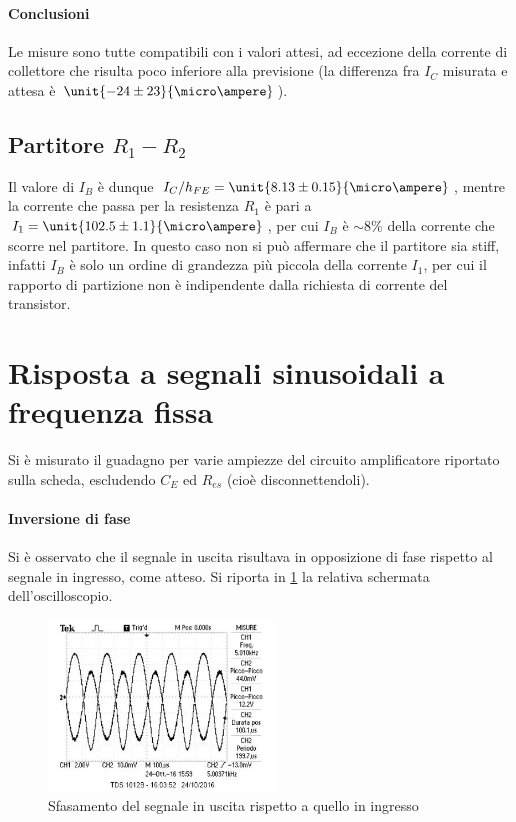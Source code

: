 \documentclass[10pt,a4paper]{article}
\begin{document}
\paragraph{Conclusioni}Le misure sono tutte compatibili con i valori attesi, ad eccezione della corrente di collettore che risulta poco inferiore alla previsione (la differenza fra $I_C$ misurata e attesa è $\unit{-24 \pm 23}{\micro\ampere}$).



\subsection{Partitore $R_1-R_2$}
Il valore di $I_B$ è dunque $I_C/h_{FE} = \unit{8.13 \pm 0.15}{\micro\ampere}$, mentre la corrente che passa per la resistenza $R_1$ è pari a $I_1 = \unit{102.5 \pm 1.1}{\micro\ampere}$, per cui $I_B$ è $\sim 8\%$ della corrente che scorre nel partitore. In questo caso non si può affermare che il partitore sia stiff, infatti $I_B$ è solo un ordine di grandezza più piccola della corrente $I_1$, per cui il rapporto di partizione non è indipendente dalla richiesta di corrente del transistor.

\section{Risposta a segnali sinusoidali a frequenza fissa}
Si è misurato il guadagno per varie ampiezze del circuito amplificatore riportato sulla scheda, escludendo $C_E$ ed $R_{es}$ (cioè disconnettendoli).

\paragraph{Inversione di fase} Si è osservato che il segnale in uscita risultava in opposizione di fase rispetto al segnale in ingresso, come atteso. Si riporta in \figurename{\ref{fig:sfasamento}} la relativa schermata dell'oscilloscopio.

\begin{figure}[h!]
	\centering
	\includegraphics[width=0.54\textwidth]{../oscilloscopio/sfasamento.jpg}
	\caption{Sfasamento del segnale in uscita rispetto a quello in ingresso}
	\label{fig:sfasamento}
\end{figure}
\end{document}
